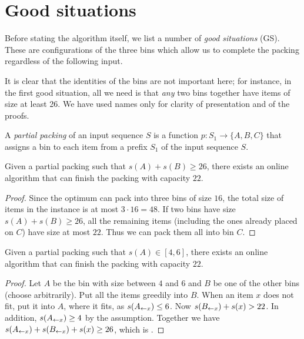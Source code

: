 \section{Good situations}\label{sec:3:gs}
Before stating the algorithm itself, we list a number of \textit{good
situations} (GS). These are configurations of the three bins which
allow us to complete the packing regardless of the following input.

It is clear that the identities of the bins are not important here;
for instance, in the first good situation, all we need is that
\emph{any} two bins together have items of size at least 26. We have
used names only for clarity of presentation and of the proofs.

\begin{dfn}
A \textit{partial packing} of an input sequence $S$
is a function $p: S_1 \to \{A,B,C\}$ that assigns a bin to each
item from a prefix $S_1$ of the input sequence $S$.
\end{dfn}


\begin{goodsit}\label{lem:gs1}
Given a partial packing such that $s(A) + s(B) \geq 26$, 
there exists an online algorithm that can finish
the packing with capacity $22$.
\end{goodsit}

\begin{proof}
Since the optimum can pack into three bins of size $16$, the total
size of items in the instance is at most $3\cdot 16=48$. If two bins
have size $s(A) + s(B) \geq 26$, all the remaining items (including
the ones already placed on $C$) have size at most $22$.  Thus we can
pack them all into bin $C$.
\end{proof}

\begin{goodsit}\label{lem:gs2}
Given a partial packing such that $s(A) \in [4, 6]$, 
there exists an online algorithm that can finish
the packing with capacity $22$.
\end{goodsit}

\begin{proof}
Let $A$ be the bin with size between $4$ and $6$ and $B$ be one of the
other bins (choose arbitrarily). Put all the items greedily into
$B$. When an item $x$ does not fit, put it into $A$, where it fits, as
 $s(A_{\leftarrow x})\le 6$. Now $s(B_{\leftarrow x})+s(x)>22$. In addition, $s(A_{\leftarrow x})\ge 4$ by the assumption.  Together we
have $s(A_{\leftarrow x}) + s(B_{\leftarrow x})+s(x) \geq 26$, which is .
\end{proof}


